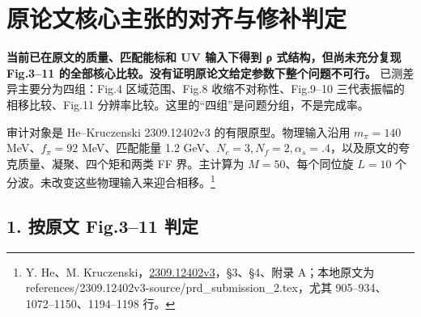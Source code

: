 \documentclass[
  11pt,
  a4paper,
]{article}
\author{}
\date{}
\begin{document}
\section{原论文核心主张的对齐与修补判定}\label{ux539fux8bbaux6587ux6838ux5fc3ux4e3bux5f20ux7684ux5bf9ux9f50ux4e0eux4feeux8865ux5224ux5b9a}

\textbf{当前已在原文的质量、匹配能标和 UV 输入下得到 ρ
式结构，但尚未充分复现 Fig.3--11
的全部核心比较。没有证明原论文给定参数下整个问题不可行。}
已测差异主要分为四组：Fig.4 区域范围、Fig.8 收缩不对称性、Fig.9--10
三代表振幅的相移比较、Fig.11
分辨率比较。这里的``四组''是问题分组，不是完成率。

审计对象是 He--Kruczenski 2309.12402v3 的有限原型。物理输入沿用
\(m_\pi=140\) MeV、\(f_\pi=92\) MeV、匹配能量 1.2
GeV、\(N_c=3,N_f=2,\alpha_s=.4\)，以及原文的夸克质量、凝聚、四个矩和两类
FF 界。主计算为 \(M=50\)、每个同位旋 \(L=10\)
个分波。未改变这些物理输入来迎合相移。\footnote{Y. He、M.
  Kruczenski，\href{https://arxiv.org/abs/2309.12402v3}{2309.12402v3}，§3、§4、附录
  A；本地原文为
  references/2309.12402v3-source/prd\_submission\_2.tex，尤其
  905--934、1072--1150、1194--1198 行。}

\subsection{1. 按原文 Fig.3--11
判定}\label{ux6309ux539fux6587-fig.311-ux5224ux5b9a}
\end{document}

